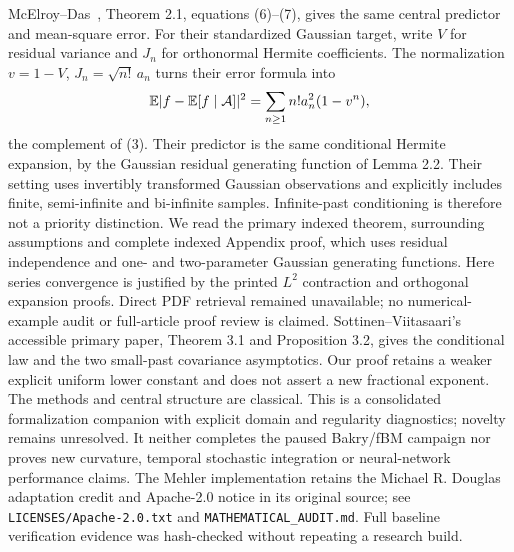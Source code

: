 \documentclass[11pt]{article}
\newcommand{\code}[1]{{\small\nolinkurl{#1}}}
\begin{document}
McElroy--Das~\cite{MD}, Theorem 2.1, equations (6)--(7), gives
the same central predictor and mean-square error. For their standardized
Gaussian target, write $V$ for residual variance and $J_n$ for
orthonormal Hermite coefficients. The normalization
$v=1-V$, $J_n=\sqrt{n!}\,a_n$ turns their error formula into
\[
 \mathbb E|f-\mathbb E[f\mid\mathcal A]|^2
       =\sum_{n\geq1}n!a_n^2(1-v^n),
\]
the complement of (3). Their predictor is the same conditional
Hermite expansion, by the Gaussian residual generating function
of Lemma 2.2. Their setting uses invertibly transformed Gaussian
observations and explicitly includes finite, semi-infinite and
bi-infinite samples. Infinite-past conditioning is therefore not
a priority distinction. We read the primary indexed theorem,
surrounding assumptions and complete indexed Appendix proof,
which uses residual independence and one- and two-parameter
Gaussian generating functions. Here series convergence is justified
by the printed $L^2$ contraction and orthogonal expansion proofs.
Direct PDF retrieval remained unavailable; no numerical-example
audit or full-article proof review is claimed.
Sottinen--Viitasaari's accessible primary paper,
Theorem 3.1 and Proposition 3.2, gives the conditional law and the two
small-past covariance asymptotics. Our proof retains a weaker explicit
uniform lower constant and does not assert a new fractional exponent.
The methods and central structure are classical. This is a consolidated
formalization companion with explicit domain and regularity diagnostics;
novelty remains unresolved. It neither completes the paused Bakry/fBM
campaign nor proves new curvature, temporal stochastic integration or
neural-network performance claims. The Mehler implementation retains the Michael R. Douglas adaptation
credit and Apache-2.0 notice in its original source; see
\code{LICENSES/Apache-2.0.txt} and \code{MATHEMATICAL_AUDIT.md}.
Full baseline verification evidence
was hash-checked without repeating a research build.
\par\endgroup
\end{document}
